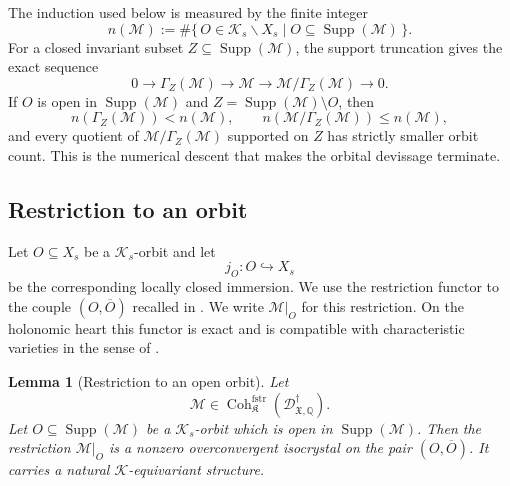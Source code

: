 \documentclass[11pt]{amsart}
\theoremstyle{plain}
\newtheorem{lemma}{Lemma}[section]
\theoremstyle{definition}
\theoremstyle{remark}
\newcommand{\Coh}{\operatorname{Coh}}
\newcommand{\Supp}{\operatorname{Supp}}
\newcommand{\fstr}{\mathrm{fstr}}
\begin{document}
The induction used below is measured by the finite integer
\begin{equation}
\label{eq:orbit-count-invariant}
  n(\mathcal M)
  :=
  \#\{\,O\in\mathcal K_s\backslash X_s
  \mid O\subseteq\Supp(\mathcal M)\,\}.
\end{equation}
For a closed invariant subset \(Z\subseteq\Supp(\mathcal M)\), the
support truncation gives the exact sequence
\begin{equation}
\label{eq:support-truncation-exact-sequence}
  0\longrightarrow\Gamma_Z(\mathcal M)
  \longrightarrow\mathcal M
  \longrightarrow\mathcal M/\Gamma_Z(\mathcal M)
  \longrightarrow0.
\end{equation}
If \(O\) is open in \(\Supp(\mathcal M)\) and
\(Z=\Supp(\mathcal M)\setminus O\), then
\[
  n(\Gamma_Z(\mathcal M))<n(\mathcal M),
  \qquad
  n(\mathcal M/\Gamma_Z(\mathcal M))\leq n(\mathcal M),
\]
and every quotient of \(\mathcal M/\Gamma_Z(\mathcal M)\) supported on
\(Z\) has strictly smaller orbit count.  This is the numerical descent that
makes the orbital devissage terminate.

\subsection{Restriction to an orbit}
\label{subsec:restriction-orbit-regularity}

Let \(O\subseteq X_s\) be a \(\mathcal K_s\)-orbit and let
\[
  j_O:O\hookrightarrow X_s
\]
be the corresponding locally closed immersion.  We use the restriction functor
to the couple \((O,\overline O)\) recalled in
.  We write \(\mathcal M|_O\) for this
restriction.  On the holonomic heart this functor is exact and is compatible
with characteristic varieties in the sense of
.

\begin{lemma}[Restriction to an open orbit]
\label{lem:restriction-to-orbit-isocrystal}
Let
\[
  \mathcal M\in
  \Coh^{\fstr}_{\mathfrak K}
  (\mathscr D^\dagger_{\mathfrak X,\mathbb Q}).
\]
Let \(O\subseteq\Supp(\mathcal M)\) be a \(\mathcal K_s\)-orbit which is open
in \(\Supp(\mathcal M)\).  Then the restriction \(\mathcal M|_O\) is a
nonzero overconvergent isocrystal on the pair \((O,\overline O)\).  It carries
a natural \(\mathcal K\)-equivariant structure.
\end{lemma}
\end{document}

